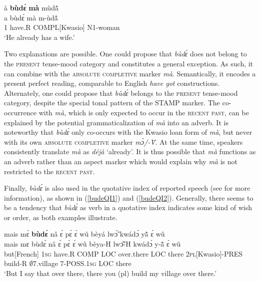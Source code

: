\begin{exe} 
\ex\label{budema}  
  \glll à {\bfseries bùdɛ́} {\bfseries mà} mùdã̂ \\
        a bùdɛ́ mà m-ùdã̂ \\
          1 have.R COMPL[Kwasio] N1-woman  \\
    \trans `He already has a wife.'
\end{exe}

Two explanations are possible. One could propose that {\itshape bùdɛ́} does not belong to the \textsc{present} tense-mood category and constitutes a general exception. As such, it can combine with the \textsc{absolute completive} marker {\itshape mà}. Semantically, it encodes a present perfect reading, comparable to English {\itshape have got} constructions. Alternately, one could propose that {\itshape bùdɛ́} belongs to the \textsc{present} tense-mood category, despite the special tonal pattern of the STAMP marker. The co-occurrence with {\itshape mà}, which is only expected to occur in the \textsc{recent past}, can be explained by the potential grammaticalization of {\itshape mà} into an adverb. It is noteworthy that {\itshape bùdɛ́} only co-occurs with the Kwasio loan form of {\itshape mà}, but never with its own \textsc{absolute completive} marker {\itshape mɔ̀/-Ṽ}. At the same time, speakers consistently translate {\itshape mà} as {\itshape déjà} `already'. It is thus possible that {\itshape mà} functions as an adverb rather than an aspect marker which would explain why {\itshape mà} is not restricted to the \textsc{recent past}.


Finally, {\itshape bùdɛ́} is also used in the quotative index of reported speech (see  for more information), as shown in (\ref{budeQI1}) and (\ref{budeQI2}). Generally, there seems to be a tendency that {\itshape bùdɛ́} as verb in a quotative index indicates some kind of wish or order, as both examples illustrate.

\begin{exe} 
\ex\label{budeQI1} 
  \glll  mais mɛ̀ {\bfseries bùdɛ́} nâ ɛ́ pɛ̀ ɛ́ wû bèyá lwɔ̃́ kwádɔ́ yã̂ ɛ́ wû \\
       mais mɛ bùdɛ́ nâ ɛ́ pɛ̀ ɛ́ wû bèya-H lwɔ̃̂-H kwádɔ́ y-ã̂ ɛ́ wû \\
         but[French] 1\textsc{sg} have.R COMP LOC over.there LOC there 2\textsc{pl}[Kwasio]-PRES build-R $\emptyset$7.village 7-POSS.1\textsc{sg} LOC there\\
    \trans `But I say that over there, there you (pl) build my village over there.'
\end{exe}


